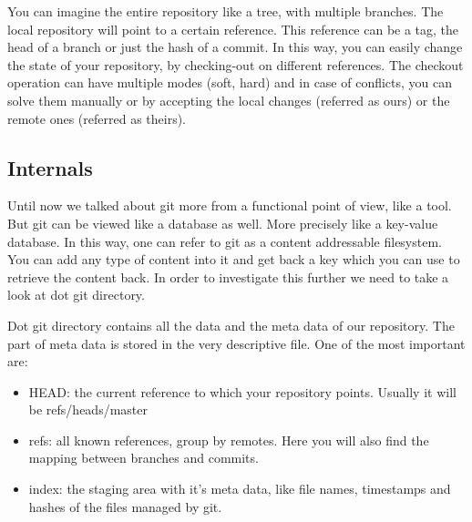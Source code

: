         You can imagine the entire repository like a tree, with multiple branches. The local repository will point to a certain reference. This reference can be a tag, the head of a branch or just the hash of a commit. In this way, you can easily change the state of your repository, by checking-out on different references. The checkout operation can have multiple modes (soft, hard) and in case of conflicts, you can solve them manually or by accepting the local changes (referred as ours) or the remote ones (referred as theirs).
        
    \subsection{Internals}
        Until now we talked about git more from a functional point of view, like a tool. But git can be viewed like a database as well. More precisely like a key-value database. In this way, one can refer to git as a content addressable filesystem. You can add any type of content into it and get back a key which you can use to retrieve the content back. In order to investigate this further we need to take a look at dot git directory.
        
        Dot git directory contains all the data and the meta data of our repository. The part of meta data is stored in the very descriptive file. One of the most important are:
        
        \begin{itemize}
            \item HEAD: the current reference to which your repository points. Usually it will be refs/heads/master
            \item refs: all known references, group by remotes. Here you will also find the mapping between branches and commits.
            \item index: the staging area with it's meta data, like file names, timestamps and hashes of the files managed by git.
        \end{itemize}
        
